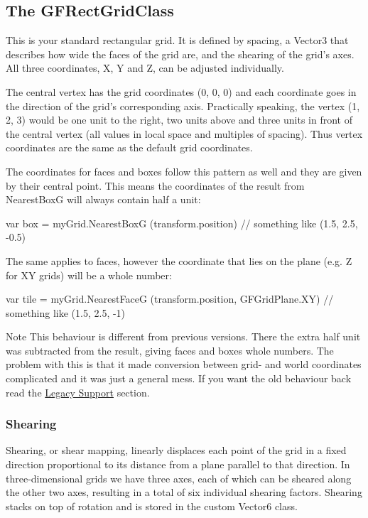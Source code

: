 \subsection*{The G\+F\+Rect\+Grid\+Class }

This is your standard rectangular grid. It is defined by {\ttfamily spacing}, a Vector3 that describes how wide the faces of the grid are, and the shearing of the grid's axes. All three coordinates, X, Y and Z, can be adjusted individually. 

The central vertex has the grid coordinates (0, 0, 0) and each coordinate goes in the direction of the grid’s corresponding axis. Practically speaking, the vertex (1, 2, 3) would be one unit to the right, two units above and three units in front of the central vertex (all values in local space and multiples of {\ttfamily spacing}). Thus vertex coordinates are the same as the default grid coordinates.

The coordinates for faces and boxes follow this pattern as well and they are given by their central point. This means the coordinates of the result from {\ttfamily Nearest\+Box\+G} will always contain half a unit\+: 
\begin{DoxyCode}
var box = myGrid.NearestBoxG (transform.position) \textcolor{comment}{// something like (1.5, 2.5, -0.5)}
\end{DoxyCode}
 The same applies to faces, however the coordinate that lies on the plane (e.\+g. Z for X\+Y grids) will be a whole number\+: 
\begin{DoxyCode}
var tile = myGrid.NearestFaceG (transform.position, GFGridPlane.XY) \textcolor{comment}{// something like (1.5, 2.5, -1)}
\end{DoxyCode}
 

\begin{DoxyNote}{Note}
This behaviour is different from previous versions. There the extra half unit was subtracted from the result, giving faces and boxes whole numbers. The problem with this is that it made conversion between grid-\/ and world coordinates complicated and it was just a general mess. If you want the old behaviour back read the \hyperlink{legacy_support}{Legacy Support} section.
\end{DoxyNote}
\subsubsection*{Shearing}

Shearing, or shear mapping, linearly displaces each point of the grid in a fixed direction proportional to its distance from a plane parallel to that direction. In three-\/dimensional grids we have three axes, each of which can be sheared along the other two axes, resulting in a total of six individual shearing factors. Shearing stacks on top of rotation and is stored in the custom {\ttfamily Vector6} class.

